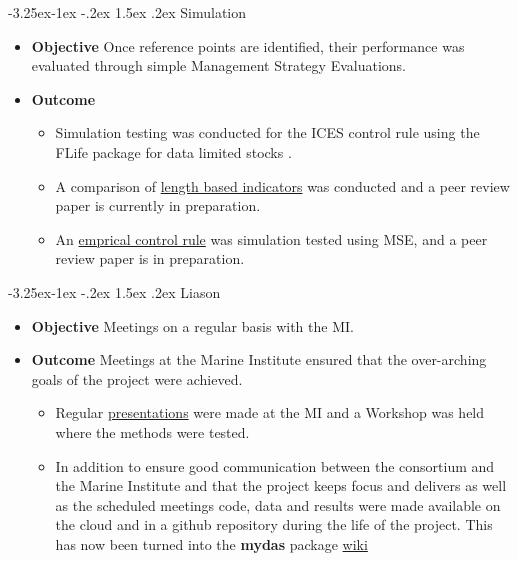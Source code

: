 \documentclass[a4paper, 10pt]{article}
\makeatletter
\renewcommand{\subsection}{\@startsection{subsection}{2}{\z@}%
 {-3.25ex\@plus -1ex \@minus -.2ex}%
 {1.5ex \@plus .2ex}%
 {\normalfont\bfseries\slshape}}
\makeatother
\begin{document}
\newpage
\subsection{Simulation}

\begin{itemize}[labelindent=\parindent,noitemsep,topsep=0pt,parsep=0pt,partopsep=0pt]
 \item \textbf{Objective} Once reference points are identified, their performance was evaluated through simple Management Strategy Evaluations.
 \item \textbf{Outcome} 
 \begin{itemize}
 \item Simulation testing was conducted for the ICES control rule using the FLife package for data limited stocks \citep{fischer2019hcr}.
 \item A comparison of \href{https://3o2y9wugzp1kfxr5hvzgzq-on.drv.tw/MyDas/papers/roc/roc.html}{length based indicators} was conducted and a peer review paper is currently in preparation.
 \item An \href{https://3o2y9wugzp1kfxr5hvzgzq-on.drv.tw/MyDas/papers/pareto/pareto.html}{emprical control rule} was simulation tested using MSE, and a peer review paper is in preparation.
  \end{itemize} 
\end{itemize}


\subsection{Liason}\label{task:liason}

\begin{itemize}[labelindent=\parindent,noitemsep,topsep=0pt,parsep=0pt,partopsep=0pt]
 \item \textbf{Objective} Meetings on a regular basis with the MI.
 \item \textbf{Outcome} 
 Meetings at the Marine Institute ensured that the over-arching goals of the project were achieved.
 \begin{itemize}
  \item  Regular \href{https://3o2y9wugzp1kfxr5hvzgzq-on.drv.tw/MyDas/presentations.html}{presentations} were made at the MI and a Workshop was held where the methods were tested.
 \item In addition to ensure good communication between the consortium and the Marine Institute and that the project keeps focus and delivers as well as the scheduled meetings code, data and results were made available on the cloud and in a github repository during the life of the project. This has now been turned into the \textbf{mydas} package \href{https://github.com/flr/mydAS/wiki}{wiki}
 \end{itemize}
\end{itemize}
\end{document}

